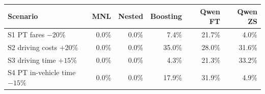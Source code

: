 \begin{tabular}{lrrrrr}
\toprule
Scenario & MNL & Nested & Boosting & Qwen FT & Qwen ZS \\
\midrule
S1 PT fares $-20\%$ & 0.0\% & 0.0\% & 7.4\% & 21.7\% & 4.0\% \\
S2 driving costs $+20\%$ & 0.0\% & 0.0\% & 35.0\% & 28.0\% & 31.6\% \\
S3 driving time $+15\%$ & 0.0\% & 0.0\% & 4.3\% & 21.3\% & 33.2\% \\
S4 PT in-vehicle time $-15\%$ & 0.0\% & 0.0\% & 17.9\% & 31.9\% & 4.9\% \\
\bottomrule
\end{tabular}
